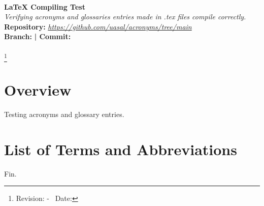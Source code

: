 \documentclass[12pt]{book}
\def\title{LaTeX Compiling Test}
\def\subtitle{Verifying acronyms and glossaries entries made in .tex files compile correctly.}
\def\repourl{\url{https://github.com/uasal/acronyms/tree/main}}
\edef\gitBranch{\gitBranch}
\begin{document}
    \renewcommand{\maketitle}{
	\pagestyle{empty}
	\thispagestyle{empty}
	\begin{center}
		\vspace{0.5cm} \mbox{}\hrulefill \mbox{}\\[1cm]
     		{\Huge \textbf{\title}\\[1cm]}
     		{\LARGE \textit{\subtitle}}\\[2cm]
            {\small \textbf{Repository: }\textit{\repourl}}\\[0.5cm]
			{\small \textbf{Branch: } \gitBranch}
			{\small \textbf{  |  Commit:} \gitDescribe}\\[0.5cm]
     		{\small \mbox{}\hrulefill\mbox{}\\[10mm]}
            \footnote{{ Revision: \gitAbbrevHash - \gitDirty\ Date: \gitCommitterDate}}
  	\end{center}
	\pagestyle{fancy}
}

    \maketitle
	\newpage

    \setcounter{secnumdepth}{4}
    \setcounter{tocdepth}{2}
    \tableofcontents

	\chapter{Overview}
    Testing acronyms and glossary entries.

	\chapter{List of Terms and Abbreviations}
	\printglossary[type=\acronymtype]
	\printglossary[type=term]

	Fin.
\end{document}
